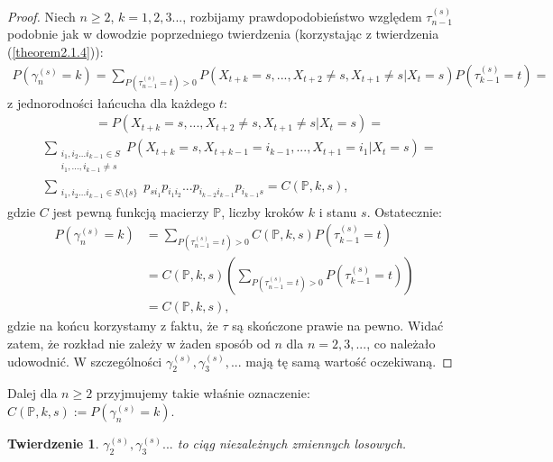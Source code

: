 \documentclass[a4paper]{article}
\theoremstyle{defn}
\theoremstyle{theorem}
\newtheorem{theorem}[defn]{Twierdzenie}
\theoremstyle{lemma}
\theoremstyle{cor}
\theoremstyle{fact}
\begin{document}
\begin{proof}
Niech $n\geq 2$, $k = 1,2,3...$, rozbijamy prawdopodobieństwo względem $\tau_{n-1}^{(s)}$ podobnie jak w dowodzie poprzedniego twierdzenia (korzystając z twierdzenia (\ref{theorem2.1.4})):\\
\begin{align*}
    P(\gamma_n^{(s)} = k) = \sum\limits_{P(\tau_{n-1}^{(s)} = t) > 0} P(X_{t+k} = s, ..., X_{t+2} \neq s, X_{t+1} \neq s| X_t = s)P(\tau_{k-1}^{(s)} = t) =
\end{align*}
z jednorodności łańcucha dla każdego $t$:
\begin{align*}
    &=P(X_{t+k} = s, ..., X_{t+2} \neq s, X_{t+1} \neq s| X_t = s) =
\end{align*}
\begin{align*}
    &\sum\limits_{\substack{i_1, i_2 ... i_{k-1} \in S\\ i_1,...,i_{k-1} \neq s}} P(X_{t+k} = s, X_{t+k-1} = i_{k-1}, ..., X_{t+1} = i_1 | X_t = s)=\\
    &\sum\limits_{\substack{i_1, i_2 ... i_{k-1} \in S\setminus \{s\}}} p_{si_1}p_{i_1 i_2}...p_{i_{k-2}i_{k-1}} p_{i_{k-1} s} = C(\mathbb{P}, k, s),
\end{align*}
gdzie $C$ jest pewną funkcją macierzy $\mathbb{P}$, liczby kroków $k$ i stanu $s$. Ostatecznie:
\begin{align*}
    P(\gamma_n^{(s)} = k) &= \sum\limits_{P(\tau_{n-1}^{(s)} = t) > 0} C(\mathbb{P}, k, s)P(\tau_{k-1}^{(s)} = t) \\
    &= C(\mathbb{P}, k, s) \left(\sum\limits_{P(\tau_{n-1}^{(s)} = t) > 0}P(\tau_{k-1}^{(s)} = t)\right) \\
    &= C(\mathbb{P}, k, s),
\end{align*}
gdzie na końcu korzystamy z faktu, że $\tau$ są skończone prawie na pewno. Widać zatem, że rozkład nie zależy w żaden sposób od $n$ dla $n = 2, 3,...$, co należało udowodnić. W szczególności $\gamma_2^{(s)}, \gamma_3^{(s)}, ...$ mają tę samą wartość oczekiwaną.
\end{proof}
Dalej dla $n\geq 2$ przyjmujemy takie właśnie oznaczenie: $C(\mathbb{P}, k, s) := P(\gamma_n^{(s)} = k)$.
\begin{theorem}\label{theorem2.5.9}
$\gamma_2^{(s)}, \gamma_3^{(s)}...$ to ciąg niezależnych zmiennych losowych.
\end{theorem}
\end{document}
